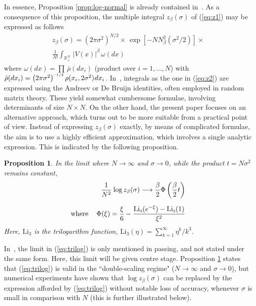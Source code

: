 \documentclass[draftclsnofoot]{IEEEtran}
\newtheorem{prop}{Proposition}
\begin{document}
In essence, Proposition \ref{prop:log-normal} is already contained in~\cite{Ti20}. As a consequence of this proposition, the multiple integral $z_\beta(\sigma)$ of (\ref{eq:z1}) may be expressed as follows
\begin{align} \label{eq:z2}
\nonumber  z_\beta(\sigma) = \left(2\pi\sigma^2\right)^{\!\scriptscriptstyle N/2}\times\,\exp\left[-NN^2_\beta(\sigma^2/2)\right]\times \\  \frac{1}{N!}\int_{\mathbb{R}^N_+}\,|V(x)|^\beta\,\omega(dx)
\end{align}
where $\omega(dx) = \prod\, \bar{\rho}(dx_i)$ (product over $i=1,\ldots,N$) with $\bar{\rho}(dx_i) = \left(2\pi\sigma^2\right)^{\!\scriptscriptstyle -1/2}\rho(x_i\hspace{0.02cm},2\sigma^2)\hspace{0.02cm}dx_i\hspace{0.03cm}$. In~\cite{Ti20}, integrals as the one in (\ref{eq:z2}) are expressed using the Andreev or De Bruijn identities, often employed in random matrix theory. These yield somewhat cumbersome formulae, involving determinants of size $N \times N$. On the other hand, the present paper focuses on an alternative approach, which turns out to be more suitable from a practical point of view. Instead of expressing $z_\beta(\sigma)$ exactly, by means of complicated formulae, the aim is to use a highly efficient approximation, which involves a single analytic expression. This is indicated by the following proposition.
\begin{prop} \label{prop:trilog}
In the limit where $N \rightarrow \infty$ and $\sigma \rightarrow 0$, while the product $t = N\sigma^2$ remains constant,  
 \begin{align} \label{eq:trilog}
   \nonumber \frac{1}{N^2}\hspace{0.02cm}\log z_\beta(\sigma) \longrightarrow \frac{\beta}{2}\Phi\left(\frac{\beta}{2}t\right) \\[0.2cm]
   \text{where }\hspace{0.3cm}
   \Phi(\xi) = \frac{\xi}{6} - \frac{\mathrm{Li}_{\scriptscriptstyle 3}(e^{-\xi}) - \mathrm{Li}_{\scriptscriptstyle 3}(1)}{\xi^2}
 \end{align}
 Here, $\mathrm{Li}_{\scriptscriptstyle 3}$ is the trilogarithm function, $\mathrm{Li}_{\scriptscriptstyle 3}(\eta) = \sum^\infty_{k=1} \eta^k/k^3$.
\end{prop}
In~\cite{Ti20}, the limit in (\ref{eq:trilog}) is only mentioned in passing, and not stated under the same form. Here, this limit will be given centre stage. Proposition \ref{prop:trilog} states that (\ref{eq:trilog}) is valid in the ``double-scaling regime" ($N \rightarrow \infty$ and $\sigma \rightarrow 0$), but numerical experiments have shown that $\log z_\beta(\sigma)$ can be replaced by the expression afforded by (\ref{eq:trilog}) without notable loss of accuracy, whenever $\sigma$ is small in comparison with $N$ (this is further illustrated below). 
\end{document}
